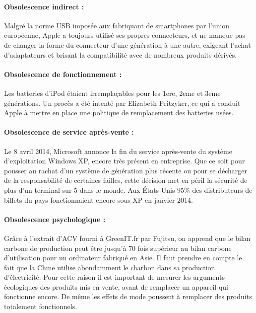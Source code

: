 \paragraph*{Obsolescence indirect :}

Malgré la norme USB imposée aux fabriquant de smartphones par l’union européenne, Apple a toujours utilisé ses propres connecteurs, et ne manque pas de changer la forme du connecteur d’une génération à une autre, exigeant l'achat d'adaptateurs et brisant la compatibilité avec de nombreux produits dérivés.

\paragraph*{Obsolescence de fonctionnement :}

Les batteries d’iPod étaient irremplaçables pour les 1ere, 2eme et 3eme générations. Un procès a été intenté par Elizabeth Pritzyker, ce qui a conduit Apple à mettre en place une politique de remplacement des batteries usées.

\paragraph*{Obsolescence de service après-vente :}

Le 8 avril 2014, Microsoft annonce la fin du service après-vente du système d’exploitation Windows XP, encore très présent en entreprise. Que ce soit pour pousser au rachat d’un système de génération plus récente ou pour se décharger de la responsabilité de certaines failles, cette décision met en péril la sécurité de plus d'un terminal sur 5 dans le monde. Aux États-Unis 95\% des distributeurs de billets du pays fonctionnaient encore sous XP en janvier 2014.

\paragraph*{Obsolescence psychologique :}

Grâce à l’extrait d’ACV fourni à GreenIT.fr par Fujitsu, on apprend que le bilan carbone de production peut être jusqu’à 70 fois supérieur au bilan carbone d’utilisation pour un ordinateur fabriqué en Asie. Il faut prendre en compte le fait que la Chine utilise abondamment le charbon dans sa production d'électricité. Pour cette raison il est important de mesurer les arguments écologiques des produits mis en vente, avant de remplacer un appareil qui fonctionne encore. De même les effets de mode poussent à remplacer des produits totalement fonctionnels.
